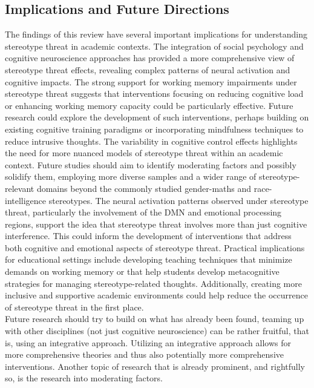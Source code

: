 \documentclass[
  stu, a4paper, 12pt,mask,floatsintext]{apa7}
\begin{document}
\subsection{Implications and Future Directions}\label{implications-and-future-directions}

The findings of this review have several important implications for understanding stereotype threat in academic contexts. The integration of social psychology and cognitive neuroscience approaches has provided a more comprehensive view of stereotype threat effects, revealing complex patterns of neural activation and cognitive impacts.
The strong support for working memory impairments under stereotype threat suggests that interventions focusing on reducing cognitive load or enhancing working memory capacity could be particularly effective.
Future research could explore the development of such interventions, perhaps building on existing cognitive training paradigms or incorporating mindfulness techniques to reduce intrusive thoughts.
The variability in cognitive control effects highlights the need for more nuanced models of stereotype threat within an academic context.
Future studies should aim to identify moderating factors and possibly solidify them, employing more diverse samples and a wider range of stereotype-relevant domains beyond the commonly studied gender-maths and race-intelligence stereotypes.
The neural activation patterns observed under stereotype threat, particularly the involvement of the DMN and emotional processing regions, support the idea that stereotype threat involves more than just cognitive interference.
This could inform the development of interventions that address both cognitive and emotional aspects of stereotype threat.
Practical implications for educational settings include developing teaching techniques that minimize demands on working memory or that help students develop metacognitive strategies for managing stereotype-related thoughts.
Additionally, creating more inclusive and supportive academic environments could help reduce the occurrence of stereotype threat in the first place.\\
Future research should try to build on what has already been found, teaming up with other disciplines (not just cognitive neuroscience) can be rather fruitful, that is, using an integrative approach.
Utilizing an integrative approach allows for more comprehensive theories and thus also potentially more comprehensive interventions.
Another topic of research that is already prominent, and rightfully so, is the research into moderating factors.
\end{document}
